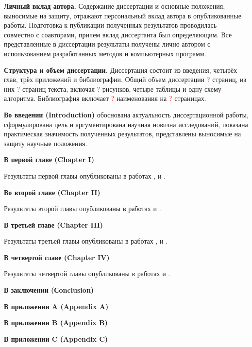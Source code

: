 \documentclass[candidate, href, colorlinks]{disser}
\begin{document}
\textbf{Личный вклад автора.}
Содержание диссертации и основные положения, выносимые на защиту, отражают персональный вклад автора в опубликованные работы.
Подготовка к публикации полученных результатов проводилась совместно с соавторами, причем вклад диссертанта был определяющим.
Все представленные в диссертации результаты получены лично автором с использованием разработанных методов и компьютерных программ.

\textbf{Структура и объем диссертации.}
Диссертация состоит из введения, четырёх глав, трёх приложений и библиографии.
Общий объем диссертации \textcolor{red}{?} страниц, из них \textcolor{red}{?} страниц текста, включая \textcolor{red}{?} рисунков, четыре таблицы и одну схему алгоритма.
Библиография включает \textcolor{red}{?} наименования на \textcolor{red}{?} страницах.


\textbf{Во введении (Introduction)} обоснована актуальность диссертационной работы, сформулирована цель и аргументирована научная новизна исследований, показана практическая значимость полученных результатов, представлены выносимые на защиту научные положения.

\textbf{В первой главе (Chapter I)}

Результаты первой главы опубликованы в работах \cite{AlfimovLebedev}, \cite{NizhniNovgorod2014} и \cite{Ufa2015}.

\textbf{Во второй главе (Chapter II)}

Результаты второй главы опубликованы в работах \cite{Bannoe2019} и \cite{Bannoe2021}.

\textbf{В третьей главе (Chapter III)}

Результаты третьей главы опубликованы в работах \cite{LebedevAlfimovMalomed}, \cite{NizhniNovgorod2016} и \cite{Tashkent2018}.

\textbf{В четвертой главе (Chapter IV)}

Результаты четвертой главы опубликованы в работах \cite{AlfimovGegelLebedevMalomedZezyulin} и \cite{Bannoe2018}.

\textbf{В заключении (Сonclusion)}

\textbf{В приложении A (Appendix A)}

\textbf{В приложении B (Appendix B)}

\textbf{В приложении C (Appendix C)}

\renewcommand{\bibname}{\protect\leftline{Bibliography}}

\renewcommand{\bibname}{\protect\leftline{\large Список публикаций автора по теме диссертации}}
\printbibliography[keyword=own]


\end{document}
